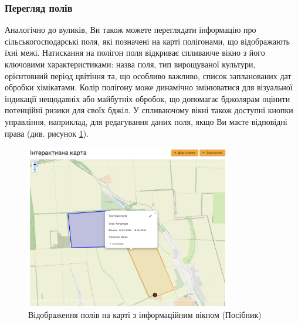 
\subsubsection{Перегляд полів}
\label{subsec:manual_map_fields}
Аналогічно до вуликів, Ви також можете переглядати інформацію про сільськогосподарські поля, які позначені на карті полігонами, що відображають їхні межі. Натискання на полігон поля відкриває спливаюче вікно з його ключовими характеристиками: назва поля, тип вирощуваної культури, орієнтовний період цвітіння та, що особливо важливо, список запланованих дат обробки хімікатами. Колір полігону може динамічно змінюватися для візуальної індикації нещодавніх або майбутніх обробок, що допомагає бджолярам оцінити потенційні ризики для своїх бджіл. У спливаючому вікні також доступні кнопки управління, наприклад, для редагування даних поля, якщо Ви маєте відповідні права (див. рисунок \ref{fig:manual_map_fields_demo}).

\begin{figure}[htbp]
    \centering
    \includegraphics[width=0.8\textwidth]{practice_report/images/map_fields_demo.png}
    \caption{Відображення полів на карті з інформаційним вікном (Посібник)}
    \label{fig:manual_map_fields_demo}
\end{figure}


